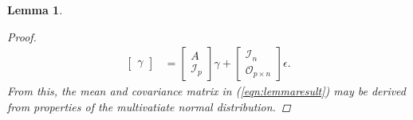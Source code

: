 \documentclass{article}
\newtheorem{lemma}[theorem]{Lemma}
\newcommand{\1}{\mathbf{1}}
\newcommand{\0}{\mathbf{0}}
\newcommand{\rscript}[2]{
\begin{itemize}
\item[]
\end{itemize}
}
\begin{document}
\begin{lemma}
\begin{proof}
\begin{align*}
\begin{bmatrix}
				\gamma
			\end{bmatrix} &= \begin{bmatrix}
				A \\ 
				\mathcal{I}_p
			\end{bmatrix} \gamma + \begin{bmatrix}
				\mathcal{I}_n \\
				\mathcal{O}_{p \times n}
			\end{bmatrix} \epsilon.
		\end{align*}
		From this, the mean and covariance matrix in (\ref{eqn:lemmaresult}) may be derived from properties of the multivatiate normal distribution.
	\end{proof}
\end{lemma} 



%
% 
% 
%

\end{document}
